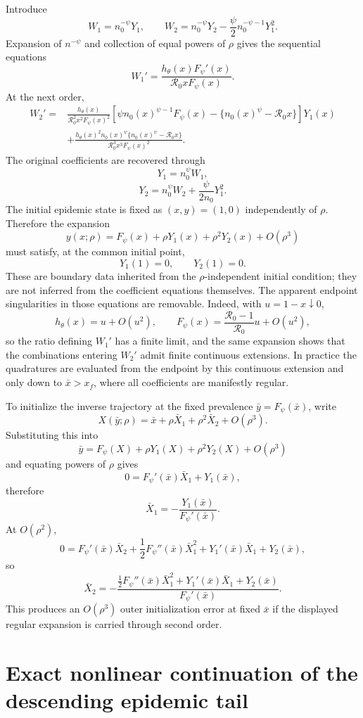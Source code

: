 \documentclass[11pt]{article}
\newcommand{\Rzero}{\mathcal R_0}
\newcommand{\hth}{h_\theta}
\newcommand{\Fpsi}{F_\psi}
\newcommand{\xf}{x_f}
\begin{document}
Introduce
\[
W_1=n_0^{-\psi}Y_1,
\qquad
W_2=n_0^{-\psi}Y_2-\frac\psi2n_0^{-\psi-1}Y_1^2.
\]
Expansion of $n^{-\psi}$ and collection of equal powers of $\rho$ gives the sequential equations
\[
\boxed{
W_1'
=\frac{\hth(x)\Fpsi'(x)}{\Rzero x\Fpsi(x)}.
}
\]
At the next order,
\[
\boxed{
\begin{aligned}
W_2'={}&
\frac{\hth(x)}{\Rzero^2x^2\Fpsi(x)^2}
\left[
\psi n_0(x)^{\psi-1}\Fpsi(x)
-\{n_0(x)^\psi-\Rzero x\}
\right]Y_1(x)\\
&+\frac{\hth(x)^2n_0(x)^\psi\{n_0(x)^\psi-\Rzero x\}}
{\Rzero^3x^3\Fpsi(x)^2}.
\end{aligned}
}
\]
The original coefficients are recovered through
\[
\boxed{Y_1=n_0^\psi W_1,}
\]
\[
\boxed{Y_2=n_0^\psi W_2+\frac\psi{2n_0}Y_1^2.}
\]
The initial epidemic state is fixed as $(x,y)=(1,0)$ independently of $\rho$.  Therefore the expansion
\[
y(x;\rho)=\Fpsi(x)+\rho Y_1(x)+\rho^2Y_2(x)+O(\rho^3)
\]
must satisfy, at the common initial point,
\[
\boxed{Y_1(1)=0,\qquad Y_2(1)=0.}
\]
These are boundary data inherited from the $\rho$-independent initial condition; they are not inferred from the coefficient equations themselves.  The apparent endpoint singularities in those equations are removable.  Indeed, with $u=1-x\downarrow0$,
\[
\hth(x)=u+O(u^2),
\qquad
\Fpsi(x)=\frac{\Rzero-1}{\Rzero}u+O(u^2),
\]
so the ratio defining $W_1'$ has a finite limit, and the same expansion shows that the combinations entering $W_2'$ admit finite continuous extensions.  In practice the quadratures are evaluated from the endpoint by this continuous extension and only down to $\bar x>\xf$, where all coefficients are manifestly regular.

To initialize the inverse trajectory at the fixed prevalence $\bar y=\Fpsi(\bar x)$, write
\[
X(\bar y;\rho)
=\bar x+\rho\bar X_1+\rho^2\bar X_2+O(\rho^3).
\]
Substituting this into
\[
\bar y
=\Fpsi(X)+\rho Y_1(X)+\rho^2Y_2(X)+O(\rho^3)
\]
and equating powers of $\rho$ gives
\[
0=\Fpsi'(\bar x)\bar X_1+Y_1(\bar x),
\]
therefore
\[
\boxed{
\bar X_1=-\frac{Y_1(\bar x)}{\Fpsi'(\bar x)}.
}
\]
At $O(\rho^2)$,
\[
0=\Fpsi'(\bar x)\bar X_2
+\frac12\Fpsi''(\bar x)\bar X_1^2
+Y_1'(\bar x)\bar X_1
+Y_2(\bar x),
\]
so
\[
\boxed{
\bar X_2
=-\frac{
\frac12\Fpsi''(\bar x)\bar X_1^2
+Y_1'(\bar x)\bar X_1
+Y_2(\bar x)
}{\Fpsi'(\bar x)}.
}
\]
This produces an $O(\rho^3)$ outer initialization error at fixed $\bar x$ if the displayed regular expansion is carried through second order.

\section{Exact nonlinear continuation of the descending epidemic tail}
\label{sec:tail}
\end{document}
